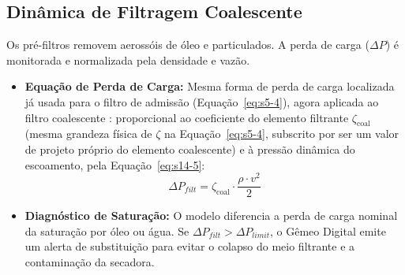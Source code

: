 \documentclass[12pt,a4paper]{article}
\numberwithin{equation}{section}
\numberwithin{table}{section}
\numberwithin{figure}{section}
\begin{document}
	\subsection{Dinâmica de Filtragem Coalescente}
	Os pré-filtros removem aerossóis de óleo e particulados. A perda de carga ($\Delta P$) é monitorada e normalizada pela densidade e vazão.
	\begin{itemize}
		\item \textbf{Equação de Perda de Carga:} Mesma forma de perda de carga localizada já usada para o filtro de admissão (Equação~\eqref{eq:s5-4}), agora aplicada ao filtro coalescente \cite{atlascopco}: proporcional ao coeficiente do elemento filtrante $\zeta_{\text{coal}}$ (mesma grandeza física de $\zeta$ na Equação~\eqref{eq:s5-4}, subscrito por ser um valor de projeto próprio do elemento coalescente) e à pressão dinâmica do escoamento, pela Equação~\eqref{eq:s14-5}:
		\begin{equation}\label{eq:s14-5}
 \Delta P_{filt} = \zeta_{\text{coal}} \cdot \frac{\rho \cdot v^2}{2}
\end{equation}
		\item \textbf{Diagnóstico de Saturação:} O modelo diferencia a perda de carga nominal da saturação por óleo ou água. Se $\Delta P_{filt} > \Delta P_{limit}$, o Gêmeo Digital emite um alerta de substituição para evitar o colapso do meio filtrante e a contaminação da secadora.
	\end{itemize}
	
\end{document}
